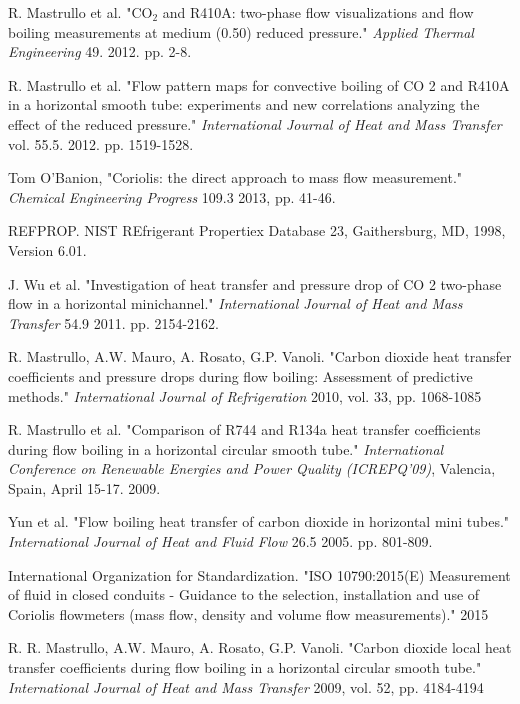 \documentclass{report}
\begin{document}
\begin{thebibliography}{9}

R. Mastrullo et al. "CO$_2$ and R410A: two-phase flow visualizations and flow boiling measurements at medium (0.50) reduced pressure." \textit{Applied Thermal Engineering} 49. 2012. pp. 2-8.

R. Mastrullo et al. "Flow pattern maps for convective boiling of CO 2 and R410A in a horizontal smooth tube: experiments and new correlations analyzing the effect of the reduced pressure." \textit{International Journal of Heat and Mass Transfer} vol. 55.5. 2012. pp. 1519-1528.

Tom O'Banion,  "Coriolis: the direct approach to mass flow measurement." \textit{Chemical Engineering Progress} 109.3 2013, pp. 41-46.

REFPROP. NIST REfrigerant Propertiex Database 23, Gaithersburg, MD, 1998, Version 6.01.

J. Wu et al. "Investigation of heat transfer and pressure drop of CO 2 two-phase flow in a horizontal minichannel." \textit{International Journal of Heat and Mass Transfer} 54.9 2011. pp. 2154-2162.

R. Mastrullo, A.W. Mauro, A. Rosato, G.P. Vanoli. "Carbon dioxide heat transfer coefficients and pressure drops during flow boiling: Assessment of predictive methods." \textit{International Journal of Refrigeration} 2010, vol. 33, pp. 1068-1085

R. Mastrullo et al. "Comparison of R744 and R134a heat transfer coefficients during flow boiling in a horizontal circular smooth tube." \textit{International Conference on Renewable Energies and Power Quality (ICREPQ’09)}, Valencia, Spain, April 15-17. 2009.

Yun et al. "Flow boiling heat transfer of carbon dioxide in horizontal mini tubes." \textit{International Journal of Heat and Fluid Flow} 26.5 2005. pp. 801-809.

International Organization for Standardization. "ISO 10790:2015(E) Measurement of fluid in closed conduits - Guidance to the selection, installation and use of Coriolis flowmeters (mass flow, density and volume flow measurements)." 2015

R. R. Mastrullo, A.W. Mauro, A. Rosato, G.P. Vanoli. "Carbon dioxide local heat transfer coefficients during flow boiling in a horizontal circular smooth tube." \textit{International Journal of Heat and Mass Transfer} 2009, vol. 52, pp. 4184-4194


\end{thebibliography}
\end{document}
